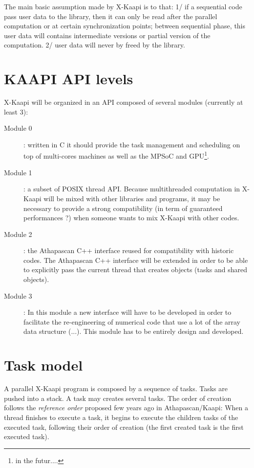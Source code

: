 \documentclass[12pt]{report}
\newcommand{\kaapi}{\textsc{X}-Kaapi\xspace}
\begin{document}
The main basic assumption made by \kaapi is to that: 1/ if a sequential code pass user data to the library, then it can only be read after the parallel computation or at certain synchronization points; between sequential phase, this user data will contains intermediate versions or partial version of the computation. 2/ user data will never by freed by the library.


\section{KAAPI API levels}

\kaapi will be organized in an API composed of several modules (currently at least 3):
\begin{description}
\item [Module 0]: written in C it should provide the task management and scheduling on top of multi-cores machines as well as the MPSoC and GPU\footnote{in the futur....}. 
\item [Module 1]: a subset of POSIX thread API. Because multithreaded computation in \kaapi will be mixed with other libraries and programs, it may be necessary to provide a strong compatibility (in term of guaranteed performances ?) when someone wants to mix \kaapi with other codes. 
\item [Module 2]: the Athapascan C++ interface reused for compatibility with historic codes. The Athapascan C++ interface will be extended in order to be able to explicitly pass the current thread that creates objects (tasks and shared objects).
\item [Module 3]: In this module a new interface will have to be developed in order to facilitate the re-engineering of numerical code that use a lot of the array data structure (...). This module has to be entirely design and developed.
\end{description}



\section{Task model}

A parallel \kaapi program is composed by a sequence of tasks. Tasks are pushed into a stack. 
A task may creates several tasks. The order of creation follows the \textit{reference order} proposed few years ago in Athapascan/Kaapi: When a thread finishes to execute a task, it begins to execute the children tasks of the executed task, following their order of creation (the first created task is the first executed task).
\end{document}
